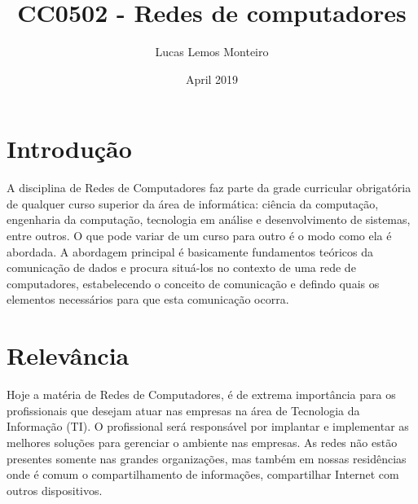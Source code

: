 \documentclass[10pt]{article}
\title{CC0502 - Redes de computadores}
\author{Lucas Lemos Monteiro}
\date{April 2019}
\begin{document}
\maketitle

\section{Introdução}
A disciplina de Redes de Computadores faz parte da grade curricular obrigatória de qualquer curso superior da área de informática: ciência da computação, engenharia da computação, tecnologia em análise e desenvolvimento de sistemas, entre outros. O que pode variar de um curso para outro é o modo como ela é abordada. A abordagem principal é basicamente fundamentos teóricos da comunicação de dados e procura situá-los no contexto de uma rede de computadores, estabelecendo o conceito de comunicação e defindo quais os elementos necessários para que esta comunicação ocorra.
\begin{figure}[!htb]
\end{figure}
\section{Relevância}
Hoje a matéria de Redes de Computadores, é de extrema importância para os profissionais que desejam atuar nas empresas na área de Tecnologia da Informação (TI). O profissional será responsável por implantar e implementar as melhores soluções para gerenciar o ambiente nas empresas. As redes não estão presentes somente nas grandes organizações, mas também em nossas residências onde é comum o compartilhamento de informações, compartilhar Internet com outros dispositivos.\cite{redes}
\end{document}
